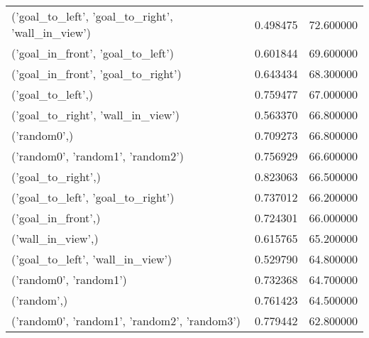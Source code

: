 \begin{tabular}{lrr}
('goal\_to\_left', 'goal\_to\_right', 'wall\_in\_view') & 0.498475 & 72.600000 \\
('goal\_in\_front', 'goal\_to\_left') & 0.601844 & 69.600000 \\
('goal\_in\_front', 'goal\_to\_right') & 0.643434 & 68.300000 \\
('goal\_to\_left',) & 0.759477 & 67.000000 \\
('goal\_to\_right', 'wall\_in\_view') & 0.563370 & 66.800000 \\
('random0',) & 0.709273 & 66.800000 \\
('random0', 'random1', 'random2') & 0.756929 & 66.600000 \\
('goal\_to\_right',) & 0.823063 & 66.500000 \\
('goal\_to\_left', 'goal\_to\_right') & 0.737012 & 66.200000 \\
('goal\_in\_front',) & 0.724301 & 66.000000 \\
('wall\_in\_view',) & 0.615765 & 65.200000 \\
('goal\_to\_left', 'wall\_in\_view') & 0.529790 & 64.800000 \\
('random0', 'random1') & 0.732368 & 64.700000 \\
('random',) & 0.761423 & 64.500000 \\
('random0', 'random1', 'random2', 'random3') & 0.779442 & 62.800000 \\
\bottomrule
\end{tabular}
